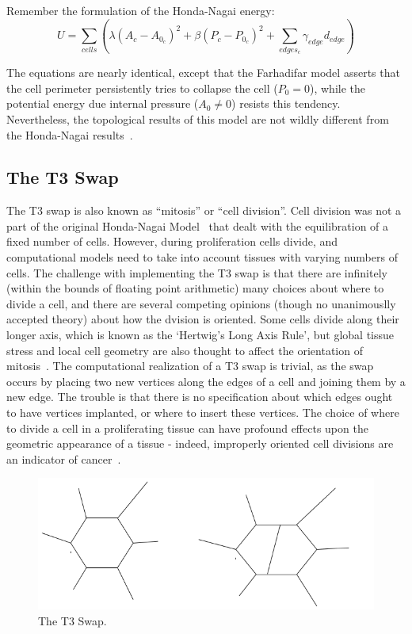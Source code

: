 Remember the formulation of the Honda-Nagai energy:
\begin{equation*}
U = \sum\limits_{cells}\left(\lambda(A_c - A_{0_c})^2 + \beta(P_c - P_{0_c})^2 + \sum_{edges_c}\gamma_{edge}d_{edge}\right)
\end{equation*}

The equations are nearly identical, except that the Farhadifar model asserts that the cell perimeter persistently tries to collapse the cell ($P_0=0$), while the potential energy due internal pressure ($A_0\ne0$) resists this tendency. Nevertheless, the topological results of this model are not wildly different from the Honda-Nagai results~\cite{Farhadifar}.

\subsection{The T3 Swap}
The T3 swap is also known as ``mitosis'' or ``cell division''. Cell division was not a part of the original Honda-Nagai Model~\cite{HondaNagai} that dealt with the equilibration of a fixed number of cells. However, during proliferation cells divide, and computational models need to take into account tissues with varying numbers of cells. The challenge with implementing the T3 swap is that there are infinitely (within the bounds of floating point arithmetic) many choices about where to divide a cell, and there are several competing opinions (though no unanimouslly accepted theory) about how the dvision is oriented. Some cells divide along their longer axis, which is known as the `Hertwig's Long Axis Rule', but global tissue stress and local cell geometry are also thought to affect the orientation of mitosis~\cite{Order, Orientation}. The computational realization of a T3 swap is trivial, as the swap occurs by placing two new vertices along the edges of a cell and joining them by a new edge. The trouble is that there is no specification about which edges ought to have vertices implanted, or where to insert these vertices. The choice of where to divide a cell in a proliferating tissue can have profound effects upon the geometric appearance of a tissue - indeed, improperly oriented cell divisions are an indicator of cancer~\cite{EpithelialTopology, misaligned}. 
\begin{figure}
\centering
\includegraphics[width=\textwidth]{../diagrams/t3.png}
\caption[The T3 Swap.]{The T3 Swap.}
\label{fig:t3}
\end{figure}


